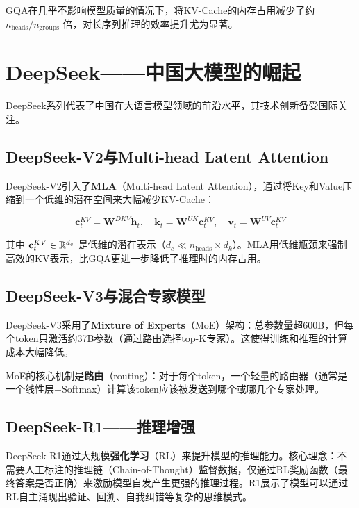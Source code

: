 GQA在几乎不影响模型质量的情况下，将KV-Cache的内存占用减少了约 $n_{\text{heads}} / n_{\text{groups}}$ 倍，对长序列推理的效率提升尤为显著。

\section{DeepSeek——中国大模型的崛起}

DeepSeek系列代表了中国在大语言模型领域的前沿水平，其技术创新备受国际关注。

\subsection{DeepSeek-V2与Multi-head Latent Attention}

DeepSeek-V2引入了\textbf{MLA}（Multi-head Latent Attention），通过将Key和Value压缩到一个低维的潜在空间来大幅减少KV-Cache：

\[
\mathbf{c}_t^{KV} = \mathbf{W}^{DKV}\mathbf{h}_t, \quad
\mathbf{k}_t = \mathbf{W}^{UK}\mathbf{c}_t^{KV}, \quad
\mathbf{v}_t = \mathbf{W}^{UV}\mathbf{c}_t^{KV}
\]

其中 $\mathbf{c}_t^{KV} \in \mathbb{R}^{d_c}$ 是低维的潜在表示（$d_c \ll n_{\text{heads}} \times d_k$）。MLA用低维瓶颈来强制高效的KV表示，比GQA更进一步降低了推理时的内存占用。

\subsection{DeepSeek-V3与混合专家模型}

DeepSeek-V3采用了\textbf{Mixture of Experts}（MoE）架构：总参数量超600B，但每个token只激活约37B参数（通过路由选择top-K专家）。这使得训练和推理的计算成本大幅降低。

MoE的核心机制是\textbf{路由}（routing）：对于每个token，一个轻量的路由器（通常是一个线性层+Softmax）计算该token应该被发送到哪个或哪几个专家处理。

\subsection{DeepSeek-R1——推理增强}

DeepSeek-R1通过大规模\textbf{强化学习}（RL）来提升模型的推理能力。核心理念：不需要人工标注的推理链（Chain-of-Thought）监督数据，仅通过RL奖励函数（最终答案是否正确）来激励模型自发产生更强的推理过程。R1展示了模型可以通过RL自主涌现出验证、回溯、自我纠错等复杂的思维模式。

